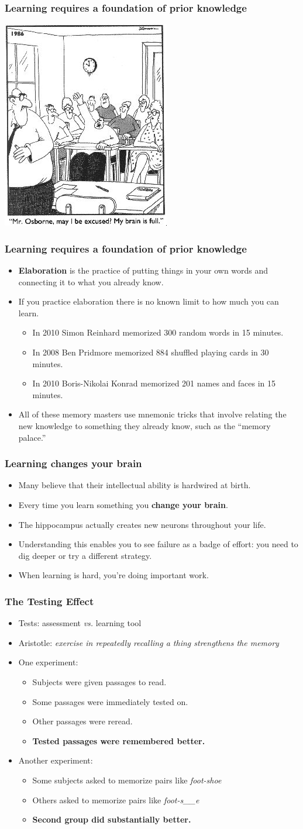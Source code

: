 \documentclass{beamer}
\newcommand{\bi}{\begin{itemize}}
\newcommand{\li}{\item}
\newcommand{\ei}{\end{itemize}}
\newcommand{\bfr}[1]{\begin{frame}[fragile]\frametitle{{ #1 }}}
\begin{document}
\bfr{Learning requires a {\bf foundation of prior knowledge}}
\begin{center}
\includegraphics[scale=0.5]{brainisfull.jpg}
\end{center}
\end{frame}

\bfr{Learning requires a {\bf foundation of prior knowledge}}
\bi
\li {\bf Elaboration} is the practice of putting things in your own words
and connecting it to what you already know.\pause
\li If you practice elaboration there is no known limit to how
much you can learn.\pause
\bi
\li In 2010 Simon Reinhard memorized 300 random words in 15 minutes.
\li In 2008 Ben Pridmore memorized 884 shuffled playing cards in 30 minutes. 
\li In 2010 Boris-Nikolai Konrad memorized 201 names and faces in 15 minutes.
\ei\pause
\li All of these memory masters use mnemonic tricks that involve
relating the new knowledge to something they already know,
such as the ``memory palace.''
\ei
\end{frame}

\bfr{Learning changes your brain}
\bi
\li Many believe that their intellectual ability is hardwired at
birth.\pause
\li Every time you learn something you {\bf change your brain}.\pause
\li The hippocampus actually creates new neurons throughout your life.\pause
\li Understanding this enables you to see failure as a badge of
effort:  you need to dig deeper or try a different strategy.\pause
\li When learning is hard, you're doing important work.
\ei
\end{frame}

\bfr{The Testing Effect}
\bi
\li Tests: assessment {\em vs.} learning tool\pause
\li Aristotle:  {\em exercise in repeatedly recalling a thing
strengthens the memory}\pause
\li One experiment:
\bi
\li Subjects were given passages to read.
\li Some passages were immediately tested on.
\li Other passages were reread.\pause
\li {\bf Tested passages were remembered better.}
\ei
\pause
\li Another experiment:
\bi
\li Some subjects asked to memorize pairs like {\em foot-shoe}
\li Others asked to memorize pairs like {\em foot-s\_\_e}\pause
\li {\bf Second group did substantially better.}
\ei
\ei\pause
\centerline{}
\end{frame}
\end{document}
